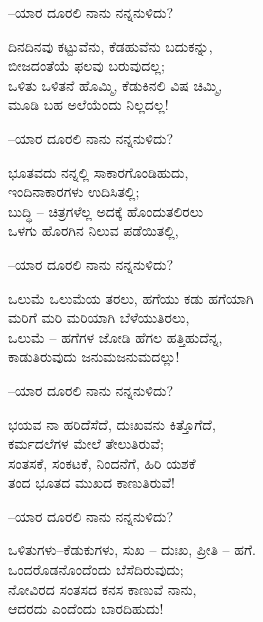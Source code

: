 \begin{flushright}
–ಯಾರ ದೂರಲಿ ನಾನು ನನ್ನನುಳಿದು?
\end{flushright}

\begin{myquote}
ದಿನದಿನವು ಕಟ್ಟುವೆನು, ಕೆಡಹುವೆನು ಬದುಕನ್ನು,\\ಬೀಜದಂತೆಯೆ ಫಲವು ಬರುವುದಲ್ಲ;\\ಒಳಿತು ಒಳಿತನೆ ಹೊಮ್ಮಿ, ಕೆಡುಕಿನಲಿ ವಿಷ ಚಿಮ್ಮಿ,\\ಮೂಡಿ ಬಹ ಅಲೆಯೆಂದು ನಿಲ್ಲದಲ್ಲ!
\end{myquote}

\begin{flushright}
–ಯಾರ ದೂರಲಿ ನಾನು ನನ್ನನುಳಿದು?
\end{flushright}

\begin{myquote}
ಭೂತವದು ನನ್ನಲ್ಲಿ ಸಾಕಾರಗೊಂಡಿಹುದು,\\ಇಂದಿನಾಕಾರಗಳು ಉದಿಸಿತಲ್ಲಿ;\\ಬುದ್ಧಿ – ಚಿತ್ರಗಳೆಲ್ಲ ಅದಕ್ಕೆ ಹೊಂದುತಲಿರಲು\\ಒಳಗು ಹೊರಗಿನ ನಿಲುವ ಪಡೆಯಿತಲ್ಲಿ,
\end{myquote}

\begin{flushright}
–ಯಾರ ದೂರಲಿ ನಾನು ನನ್ನನುಳಿದು?
\end{flushright}

\begin{myquote}
ಒಲುಮೆ ಒಲುಮೆಯ ತರಲು, ಹಗೆಯು ಕಡು ಹಗೆಯಾಗಿ\\ಮರಿಗೆ ಮರಿ ಮರಿಯಾಗಿ ಬೆಳೆಯುತಿರಲು,\\ಒಲುಮೆ – ಹಗೆಗಳ ಜೋಡಿ ಹೆಗಲ ಹತ್ತಿಹುದೆನ್ನ,\\ಕಾಡುತಿರುವುದು ಜನುಮಜನುಮದಲ್ಲು!
\end{myquote}

\begin{flushright}
–ಯಾರ ದೂರಲಿ ನಾನು ನನ್ನನುಳಿದು?
\end{flushright}

\begin{myquote}
ಭಯವ ನಾ ಹರಿದೆಸೆದೆ, ದುಃಖವನು ಕಿತ್ತೊಗೆದೆ,\\ಕರ್ಮದಲೆಗಳ ಮೇಲೆ ತೇಲುತಿರುವೆ;\\ಸಂತಸಕೆ, ಸಂಕಟಕೆ, ನಿಂದನೆಗೆ, ಹಿರಿ ಯಶಕೆ\\ತಂದ ಭೂತದ ಮುಖದ ಕಾಣುತಿರುವೆ!
\end{myquote}

\begin{flushright}
–ಯಾರ ದೂರಲಿ ನಾನು ನನ್ನನುಳಿದು?
\end{flushright}

\begin{myquote}
ಒಳಿತುಗಳು–ಕೆಡುಕುಗಳು, ಸುಖ – ದುಃಖ, ಪ್ರೀತಿ – ಹಗೆ.\\ಒಂದರೊಡನೊಂದೆಂದು ಬೆಸೆದಿರುವುದು;\\ನೋವಿರದ ಸಂತಸದ ಕನಸ ಕಾಣುವೆ ನಾನು,\\ಆದರದು ಎಂದೆಂದು ಬಾರದಿಹುದು!
\end{myquote}

